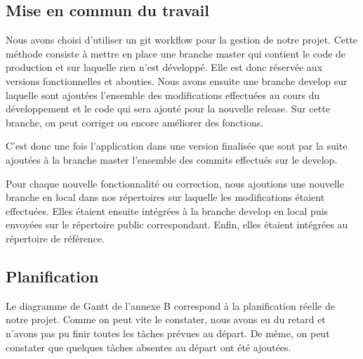 \documentclass{report}
\begin{document}
\subsection{Mise en commun du travail}
\hspace{0.5cm}Nous avons choisi d'utiliser un git workflow pour la gestion de notre projet. Cette méthode consiste à mettre en place une branche master qui contient le code de production et sur laquelle rien n'est développé. Elle est donc réservée aux versions fonctionnelles et abouties.
Nous avons ensuite une branche develop sur laquelle sont ajoutées l'ensemble des modifications effectuées au cours du développement et le code qui sera ajouté pour la nouvelle release. Sur cette branche, on peut corriger ou encore améliorer des fonctions. \par
C'est donc une fois l'application dans une version finalisée que sont par la suite ajoutées à la branche master l'ensemble des commits effectués sur le develop.\par
Pour chaque nouvelle fonctionnalité ou correction, nous ajoutions une nouvelle branche en local dans nos répertoires sur laquelle les modifications étaient effectuées. Elles étaient ensuite intégrées à la branche develop en local puis envoyées sur le répertoire public correspondant. Enfin, elles étaient intégrées au répertoire de référence.\par

\subsection{Planification}
\hspace{0.5cm}Le diagramme de Gantt de l'annexe B correspond à la planification réelle de notre projet. Comme on peut vite le constater, nous avons eu du retard et n'avons pas pu finir toutes les tâches prévues au départ. De même, on peut constater que quelques tâches absentes au départ ont été ajoutées.\par
\end{document}
